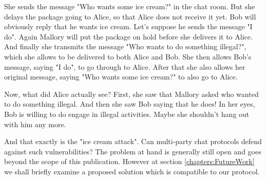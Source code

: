 She sends the message "Who wants some ice cream?" in the chat room.
But she delays the package going to Alice, so that Alice does not receive it yet.
Bob will obviously reply that he wants ice cream.
Let's suppose he sends the message "I do".
Again Mallory will put the package on hold before she delivers it to Alice.
And finally she transmits the message "Who wants to do something illegal?", which she allows to be delivered to both Alice and Bob.
She then allows Bob's message, saying "I do", to go through to Alice.
After that she also allows her original message, saying "Who wants some ice cream?" to also go to Alice.

Now, what did Alice actually see?
First, she saw that Mallory asked who wanted to do something illegal.
And then she saw Bob saying that he does!
In her eyes, Bob is willing to do engage in illegal activities.
Maybe she shouldn't hang out with him any more.

And that exactly is the "ice cream attack".
Can multi-party chat protocols defend against such vulnerabilities?
The problem at hand is generally still open and goes beyond the scope of this publication.
However at section \ref{chapters:FutureWork} we shall briefly examine a proposed solution which is compatible to our protocol.
